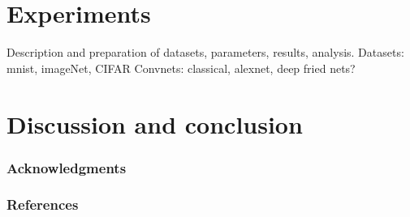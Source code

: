 \documentclass{article} %
\begin{document}
\section{Experiments}
Description and preparation of datasets, parameters, results, analysis.
Datasets: mnist, imageNet, CIFAR
Convnets: classical, alexnet, deep fried nets?


\section{Discussion and conclusion}



\subsubsection*{Acknowledgments}



\subsubsection*{References}




\end{document}
